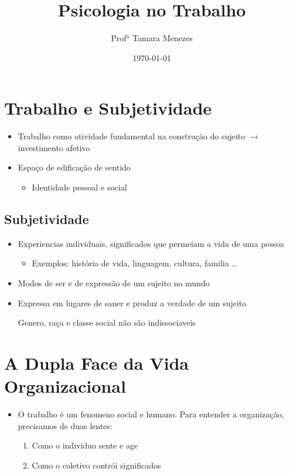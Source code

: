 \documentclass[12pt]{article}
\title{Psicologia no Trabalho}
\author{Prof$\mathrm{^a}$ Tamara Menezes}
\date{\today}
\begin{document}
\maketitle
\tableofcontents

\section{Trabalho e Subjetividade}
\begin{itemize}
    \item Trabalho como atividade fundamental na construção do sujeito 
    $\rightarrow$ investimento afetivo
    \item Espaço de edificação de sentido
    \begin{itemize}
        \item Identidade pessoal e social
    \end{itemize}
\end{itemize}
\subsection{Subjetividade}
\begin{itemize}
    \item Experiencias individuais, significados que permeiam a vida de uma 
    pessoa
    \begin{itemize}
        \item Exemplos: história de vida, linguagem, cultura, familia \ldots
    \end{itemize}
    \item Modos de ser e de expressão de um sujeito no mundo
    \item Expressa em lugares de saner e produz a verdade de um sujeito
    
    Genero, raça e classe social não são indissociaveis
\end{itemize}

\section{A Dupla Face da Vida Organizacional}
\begin{itemize}
    \item O trabalho é um fenomeno social e humano. Para entender a organização,
    precisamos de duas lentes:
    \begin{enumerate}
        \item Como o individuo sente e age
        \item Como o coletivo contrói significados
    \end{enumerate}
\end{itemize}
\end{document}
